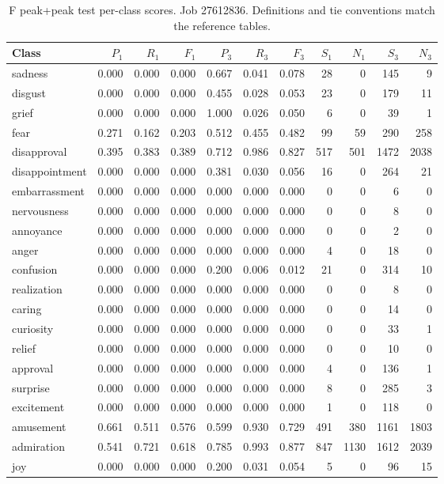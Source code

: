 \begin{table}[!htbp]
\centering
\scriptsize
\setlength{\tabcolsep}{5pt}
\begin{tabular}{lrrrrrrrrrr}
\toprule
Class & $P_1$ & $R_1$ & $F_1$ & $P_3$ & $R_3$ & $F_3$ & $S_1$ & $N_1$ & $S_3$ & $N_3$ \\
\midrule
sadness & 0.000 & 0.000 & 0.000 & 0.667 & 0.041 & 0.078 & 28 & 0 & 145 & 9 \\
disgust & 0.000 & 0.000 & 0.000 & 0.455 & 0.028 & 0.053 & 23 & 0 & 179 & 11 \\
grief & 0.000 & 0.000 & 0.000 & 1.000 & 0.026 & 0.050 & 6 & 0 & 39 & 1 \\
fear & 0.271 & 0.162 & 0.203 & 0.512 & 0.455 & 0.482 & 99 & 59 & 290 & 258 \\
disapproval & 0.395 & 0.383 & 0.389 & 0.712 & 0.986 & 0.827 & 517 & 501 & 1472 & 2038 \\
disappointment & 0.000 & 0.000 & 0.000 & 0.381 & 0.030 & 0.056 & 16 & 0 & 264 & 21 \\
embarrassment & 0.000 & 0.000 & 0.000 & 0.000 & 0.000 & 0.000 & 0 & 0 & 6 & 0 \\
nervousness & 0.000 & 0.000 & 0.000 & 0.000 & 0.000 & 0.000 & 0 & 0 & 8 & 0 \\
annoyance & 0.000 & 0.000 & 0.000 & 0.000 & 0.000 & 0.000 & 0 & 0 & 2 & 0 \\
anger & 0.000 & 0.000 & 0.000 & 0.000 & 0.000 & 0.000 & 4 & 0 & 18 & 0 \\
confusion & 0.000 & 0.000 & 0.000 & 0.200 & 0.006 & 0.012 & 21 & 0 & 314 & 10 \\
realization & 0.000 & 0.000 & 0.000 & 0.000 & 0.000 & 0.000 & 0 & 0 & 8 & 0 \\
caring & 0.000 & 0.000 & 0.000 & 0.000 & 0.000 & 0.000 & 0 & 0 & 14 & 0 \\
curiosity & 0.000 & 0.000 & 0.000 & 0.000 & 0.000 & 0.000 & 0 & 0 & 33 & 1 \\
relief & 0.000 & 0.000 & 0.000 & 0.000 & 0.000 & 0.000 & 0 & 0 & 10 & 0 \\
approval & 0.000 & 0.000 & 0.000 & 0.000 & 0.000 & 0.000 & 4 & 0 & 136 & 1 \\
surprise & 0.000 & 0.000 & 0.000 & 0.000 & 0.000 & 0.000 & 8 & 0 & 285 & 3 \\
excitement & 0.000 & 0.000 & 0.000 & 0.000 & 0.000 & 0.000 & 1 & 0 & 118 & 0 \\
amusement & 0.661 & 0.511 & 0.576 & 0.599 & 0.930 & 0.729 & 491 & 380 & 1161 & 1803 \\
admiration & 0.541 & 0.721 & 0.618 & 0.785 & 0.993 & 0.877 & 847 & 1130 & 1612 & 2039 \\
joy & 0.000 & 0.000 & 0.000 & 0.200 & 0.031 & 0.054 & 5 & 0 & 96 & 15 \\
\bottomrule
\end{tabular}
\caption{F peak+peak test per-class scores. Job 27612836. Definitions and tie conventions match the reference tables.}
\label{tab:classes-f_peak_control}
\end{table}

